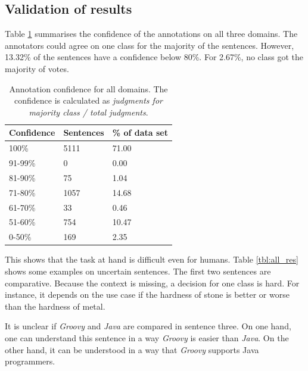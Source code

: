 \subsection{Validation of results}
Table \ref{fig:all_agg} summarises the confidence of the annotations on all three domains. The annotators could agree on one class for the majority of the sentences. However, 13.32\% of the sentences have a confidence below 80\%. For 2.67\%, no class got the majority of votes. 

\begin{table}[h]
\caption{Annotation confidence for all domains. The confidence is calculated as \emph{judgments for majority class / total judgments}.}
\label{fig:all_agg}
\begin{tabularx}{\textwidth}{XXX}
\toprule
Confidence & Sentences & \% of data set \\
\midrule
100\%	&	5111	&	71.00	 \\ 
91-99\%	&	0	&	0.00	 \\ 
81-90\%	&	75	&	1.04	 \\ 
71-80\%	&	1057	&	14.68	 \\ 
61-70\%	&	33	&	0.46	 \\ 
51-60\%	&	754	&	10.47	 \\ 
0-50\%	&	169	&	2.35	 \\ 
\bottomrule
\end{tabularx}
\end{table}

This shows that the task at hand is difficult even for humans. Table \ref{tbl:all_res} shows some examples on uncertain sentences. The first two sentences are comparative. Because the context is missing, a decision for one class is hard. For instance, it depends on the use case if the hardness of stone is better or worse than the hardness of metal.

It is unclear if \emph{Groovy} and \emph{Java} are compared in sentence three. On one hand, one can understand this sentence in a way \emph{Groovy} is easier than \emph{Java}. On the other hand, it can be understood in a way that \emph{Groovy} supports Java programmers.

